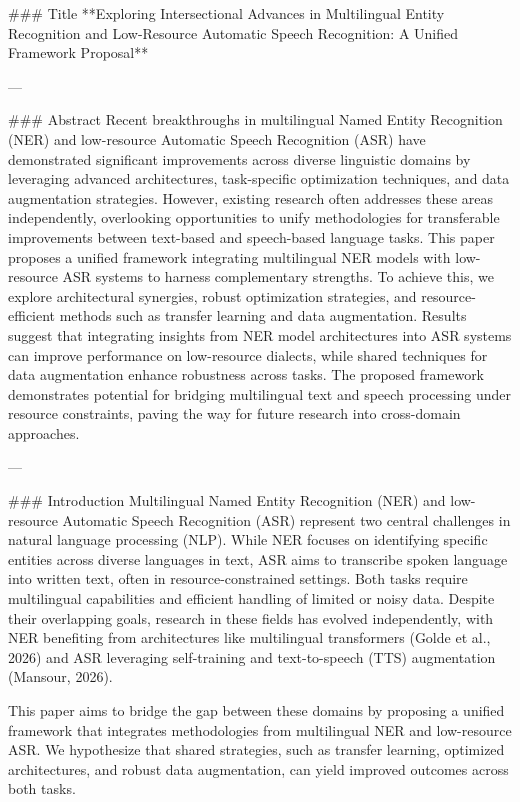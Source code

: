 ### Title  
**Exploring Intersectional Advances in Multilingual Entity Recognition and Low-Resource Automatic Speech Recognition: A Unified Framework Proposal**

---

### Abstract  
Recent breakthroughs in multilingual Named Entity Recognition (NER) and low-resource Automatic Speech Recognition (ASR) have demonstrated significant improvements across diverse linguistic domains by leveraging advanced architectures, task-specific optimization techniques, and data augmentation strategies. However, existing research often addresses these areas independently, overlooking opportunities to unify methodologies for transferable improvements between text-based and speech-based language tasks. This paper proposes a unified framework integrating multilingual NER models with low-resource ASR systems to harness complementary strengths. To achieve this, we explore architectural synergies, robust optimization strategies, and resource-efficient methods such as transfer learning and data augmentation. Results suggest that integrating insights from NER model architectures into ASR systems can improve performance on low-resource dialects, while shared techniques for data augmentation enhance robustness across tasks. The proposed framework demonstrates potential for bridging multilingual text and speech processing under resource constraints, paving the way for future research into cross-domain approaches.

---

### Introduction  
Multilingual Named Entity Recognition (NER) and low-resource Automatic Speech Recognition (ASR) represent two central challenges in natural language processing (NLP). While NER focuses on identifying specific entities across diverse languages in text, ASR aims to transcribe spoken language into written text, often in resource-constrained settings. Both tasks require multilingual capabilities and efficient handling of limited or noisy data. Despite their overlapping goals, research in these fields has evolved independently, with NER benefiting from architectures like multilingual transformers (Golde et al., 2026) and ASR leveraging self-training and text-to-speech (TTS) augmentation (Mansour, 2026).

This paper aims to bridge the gap between these domains by proposing a unified framework that integrates methodologies from multilingual NER and low-resource ASR. We hypothesize that shared strategies, such as transfer learning, optimized architectures, and robust data augmentation, can yield improved outcomes across both tasks.


